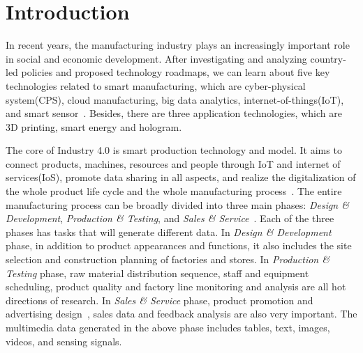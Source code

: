 \documentclass[a4paper,fleqn]{cas-dc}
\begin{document}
\section{Introduction}
In recent years, the manufacturing industry plays an increasingly important role in social and economic development.
After investigating and analyzing country-led policies and proposed technology roadmaps, we can learn about five key technologies related to smart manufacturing, which are cyber-physical system(CPS), cloud manufacturing, big data analytics, internet-of-things(IoT), and smart sensor~\cite{Gehlot2022,Kang2016}.
Besides, there are three application technologies, which are 3D printing, smart energy and hologram.

The core of Industry 4.0 is smart production technology and model. It aims to connect products, machines, resources and people through IoT and internet of services(IoS), promote data sharing in all aspects, and realize the digitalization of the whole product life cycle and the whole manufacturing process~\cite{Cardoso2010,Gubbi2013}.
The entire manufacturing process can be broadly divided into three main phases: \textit{Design \& Development}, \textit{Production \& Testing}, and \textit{Sales \& Service}~\cite{Zhou2019}.
Each of the three phases has tasks that will generate different data.
In \textit{Design \& Development} phase, in addition to product appearances and functions, it also includes the site selection and construction planning of factories and stores.
In \textit{Production \& Testing} phase, raw material distribution sequence, staff and equipment scheduling, product quality and factory line monitoring and analysis are all hot directions of research.
In \textit{Sales \& Service} phase, product promotion and advertising design~\cite{Guo2021}, sales data and feedback analysis are also very important.
The multimedia data generated in the above phase includes tables, text, images, videos, and sensing signals.
\end{document}

